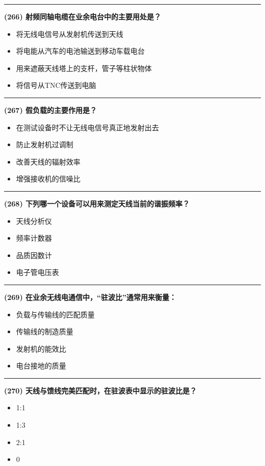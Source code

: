 \documentclass[twocolumn]{ctexart}  %
\begin{document}
\noindent\rule{0.5\textwidth}{1pt}
\heiti \textbf{(266) 射频同轴电缆在业余电台中的主要用处是？} \songti {\color{gray} [LK1173] }
\begin{itemize}
	\item  将无线电信号从发射机传送到天线
	\item  将电能从汽车的电池输送到移动车载电台
	\item  用来遮蔽天线塔上的支杆，管子等柱状物体
	\item  将信号从TNC传送到电脑
\end{itemize}


\noindent\rule{0.5\textwidth}{1pt}
\heiti \textbf{(267) 假负载的主要作用是？} \songti {\color{gray} [LK1183] }
\begin{itemize}
	\item  在测试设备时不让无线电信号真正地发射出去
	\item  防止发射机过调制
	\item  改善天线的辐射效率
	\item  增强接收机的信噪比
\end{itemize}


\noindent\rule{0.5\textwidth}{1pt}
\heiti \textbf{(268) 下列哪一个设备可以用来测定天线当前的谐振频率？} \songti {\color{gray} [LK1184] }
\begin{itemize}
	\item  天线分析仪
	\item  频率计数器
	\item  品质因数计
	\item  电子管电压表
\end{itemize}


\noindent\rule{0.5\textwidth}{1pt}
\heiti \textbf{(269) 在业余无线电通信中，“驻波比”通常用来衡量：} \songti {\color{gray} [LK1185] }
\begin{itemize}
	\item  负载与传输线的匹配质量
	\item  传输线的制造质量
	\item  发射机的能效比
	\item  电台接地的质量
\end{itemize}


\noindent\rule{0.5\textwidth}{1pt}
\heiti \textbf{(270) 天线与馈线完美匹配时，在驻波表中显示的驻波比是？} \songti {\color{gray} [LK1186] }
\begin{itemize}
	\item  1:1
	\item  1:3
	\item  2:1
	\item  0
\end{itemize}
\end{document}
